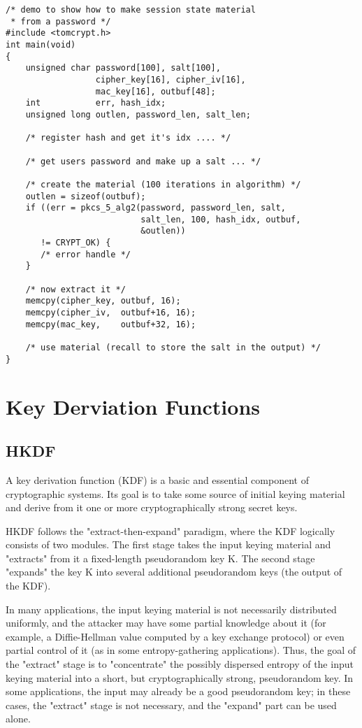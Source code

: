 \documentclass[synpaper]{book}
\newcommand{\mysection}[1]    %
	{                   %
	\section{#1}
   \markboth{\textsf{www.libtom.org}}{\thesection ~ {#1}}
	}
\begin{document}
\begin{verbatim}
/* demo to show how to make session state material
 * from a password */
#include <tomcrypt.h>
int main(void)
{
    unsigned char password[100], salt[100],
                  cipher_key[16], cipher_iv[16],
                  mac_key[16], outbuf[48];
    int           err, hash_idx;
    unsigned long outlen, password_len, salt_len;

    /* register hash and get it's idx .... */

    /* get users password and make up a salt ... */

    /* create the material (100 iterations in algorithm) */
    outlen = sizeof(outbuf);
    if ((err = pkcs_5_alg2(password, password_len, salt,
                           salt_len, 100, hash_idx, outbuf,
                           &outlen))
       != CRYPT_OK) {
       /* error handle */
    }

    /* now extract it */
    memcpy(cipher_key, outbuf, 16);
    memcpy(cipher_iv,  outbuf+16, 16);
    memcpy(mac_key,    outbuf+32, 16);

    /* use material (recall to store the salt in the output) */
}
\end{verbatim}

\mysection{Key Derviation Functions}
\subsection{HKDF}
A key derivation function (KDF) is a basic and essential component of cryptographic systems.  Its goal is to take some source of initial
keying material and derive from it one or more cryptographically strong secret keys.

HKDF follows the "extract-then-expand" paradigm, where the KDF logically consists of two modules.  The first stage takes the input
keying material and "extracts" from it a fixed-length pseudorandom key K.  The second stage "expands" the key K into several additional
pseudorandom keys (the output of the KDF).

In many applications, the input keying material is not necessarily distributed uniformly, and the attacker may have some partial
knowledge about it (for example, a Diffie-Hellman value computed by a key exchange protocol) or even partial control of it (as in some
entropy-gathering applications).  Thus, the goal of the "extract" stage is to "concentrate" the possibly dispersed entropy of the input
keying material into a short, but cryptographically strong, pseudorandom key.  In some applications, the input may already be a
good pseudorandom key; in these cases, the "extract" stage is not necessary, and the "expand" part can be used alone.
\end{document}
